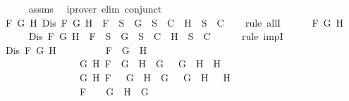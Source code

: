 \begin{isabellebody}
\ \ \ \ \isamarkupfalse%
\ assms\ \isamarkupfalse%
\ {\isacharparenleft}iprover\ elim{\isacharcolon}\ conjunct{}{\isacharparenright}\ \isanewline
\ \ \isamarkupfalse%
\ {\isachardoublequoteopen}{\isasymforall}F\ G\ H{\isachardot}\ Dis\ F\ G\ H\ {\isasymlongrightarrow}\ F\ {\isasymin}\ S\ {\isasymlongrightarrow}\ {\isacharbraceleft}G{\isacharbraceright}\ {\isasymunion}\ S\ {\isasymin}\ C\ {\isasymor}\ {\isacharbraceleft}H{\isacharbraceright}\ {\isasymunion}\ S\ {\isasymin}\ C{\isachardoublequoteclose}\isanewline
\ \ \isamarkupfalse%
\ {\isacharparenleft}rule\ allI{\isacharparenright}{\isacharplus}\isanewline
\ \ \ \ \isamarkupfalse%
\ F\ G\ H\isanewline
\ \ \ \ \isamarkupfalse%
\ {\isachardoublequoteopen}Dis\ F\ G\ H\ {\isasymlongrightarrow}\ F\ {\isasymin}\ S\ {\isasymlongrightarrow}\ {\isacharbraceleft}G{\isacharbraceright}\ {\isasymunion}\ S\ {\isasymin}\ C\ {\isasymor}\ {\isacharbraceleft}H{\isacharbraceright}\ {\isasymunion}\ S\ {\isasymin}\ C{\isachardoublequoteclose}\isanewline
\ \ \ \ \isamarkupfalse%
\ {\isacharparenleft}rule\ impI{\isacharparenright}\isanewline
\ \ \ \ \ \ \isamarkupfalse%
\ {\isachardoublequoteopen}Dis\ F\ G\ H{\isachardoublequoteclose}\isanewline
\ \ \ \ \ \ \isamarkupfalse%
\ \isamarkupfalse%
\ {\isachardoublequoteopen}F\ {\isacharequal}\ G\ \isactrlbold {\isasymor}\ H\ {\isasymor}\ \isanewline
\ \ \ \ \ \ \ \ \ \ \ \ \ \ \ \ {\isacharparenleft}{\isasymexists}G{}\ H{}{\isachardot}\ F\ {\isacharequal}\ G{}\ \isactrlbold {\isasymrightarrow}\ H{}\ {\isasymand}\ G\ {\isacharequal}\ \isactrlbold {\isasymnot}\ G{}\ {\isasymand}\ H\ {\isacharequal}\ H{}{\isacharparenright}\ {\isasymor}\ \isanewline
\ \ \ \ \ \ \ \ \ \ \ \ \ \ \ \ {\isacharparenleft}{\isasymexists}G{}\ H{}{\isachardot}\ F\ {\isacharequal}\ \isactrlbold {\isasymnot}\ {\isacharparenleft}G{}\ \isactrlbold {\isasymand}\ H{}{\isacharparenright}\ {\isasymand}\ G\ {\isacharequal}\ \isactrlbold {\isasymnot}\ G{}\ {\isasymand}\ H\ {\isacharequal}\ \isactrlbold {\isasymnot}\ H{}{\isacharparenright}\ {\isasymor}\ \isanewline
\ \ \ \ \ \ \ \ \ \ \ \ \ \ \ \ F\ {\isacharequal}\ \isactrlbold {\isasymnot}\ {\isacharparenleft}\isactrlbold {\isasymnot}\ G{\isacharparenright}\ {\isasymand}\ H\ {\isacharequal}\ G{\isachardoublequoteclose}\ \isanewline
\ \ \ \ \ \ \ \ \isamarkupfalse%

\end{isabellebody}
